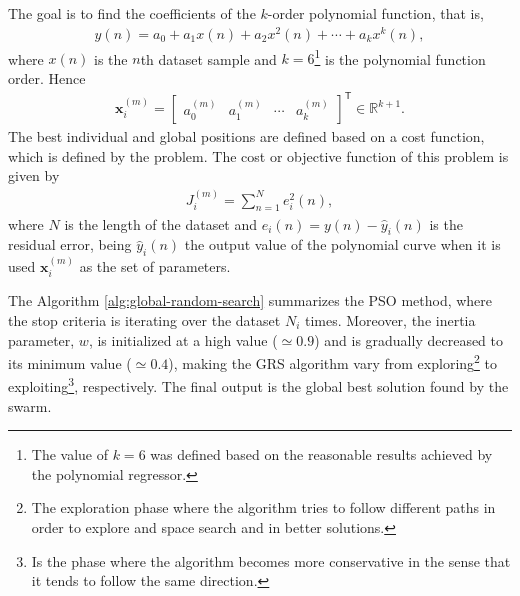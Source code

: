 \documentclass[12pt,a4paper]{article}
\newcommand{\trans}{\mathsf{T}}
\newcommand{\Real}{\mathbb{R}}
\begin{document}
The goal is to find the coefficients of the \(k\)-order polynomial function, that is,
\begin{align}
    y(n) = a_0 + a_1 x(n) + a_2 x^2(n) + \cdots + a_k x^k(n),
\end{align}
where \(x(n)\) is the \(n\)th dataset sample and \(k=6\)\footnote{The value of \(k=6\) was defined based on the reasonable results achieved by the polynomial regressor.} is the polynomial function order. Hence
 \begin{align}
    \mathbf{x}_i^{(m)} = \begin{bmatrix}
        a_0^{(m)} & a_1^{(m)} & \cdots & a_k^{(m)}
    \end{bmatrix}^\trans \in \Real^{k+1}.
\end{align}
The best individual and global positions are defined based on a cost function, which is defined by the problem. The cost or objective function of this problem is given by
\begin{align}
    J_i^{(m)} = \sum_{n=1}^{N} e_i^2 (n),
\end{align}
where \(N\) is the length of the dataset and \(e_i(n) = y(n) - \hat{y}_i(n) \) is the residual error, being \(\hat{y}_i(n)\) the output value of the polynomial curve when it is used \(\mathbf{x}_i^{(m)}\) as the set of parameters.

The Algorithm \ref{alg:global-random-search} summarizes the PSO method, where the stop criteria is iterating over the dataset \(N_i\) times. Moreover, the inertia parameter, \(w\), is initialized at a high value (\(\simeq 0.9\)) and is gradually decreased to its minimum value (\(\simeq 0.4\)), making the GRS algorithm vary from exploring\footnote{The exploration phase where the algorithm tries to follow different paths in order to explore and space search and in better solutions.} to exploiting\footnote{Is the phase where the algorithm becomes more conservative in the sense that it tends to follow the same direction.}, respectively. The final output is the global best solution found by the swarm.
\end{document}

